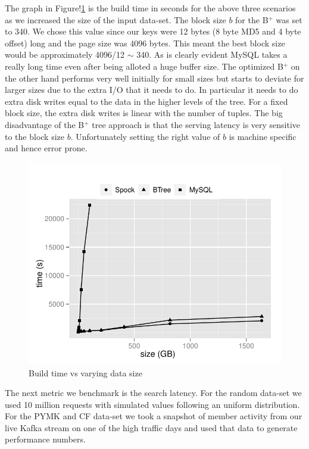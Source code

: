 The graph in Figure!\ref{build} is the build time in seconds for the
above three scenarios as we increased the size of the input data-set.
The block size $b$ for the B$^{+}$ was set to 340. We chose this value
since our keys were 12 bytes (8 byte MD5 and 4 byte offset) long and
the page size was 4096 bytes. This meant the best block size would be
approximately 4096/12 $\sim$ 340. As is clearly evident MySQL takes a
really long time even after being alloted a huge buffer size. The
optimized B$^{+}$ on the other hand performs very well initially for
small sizes but starts to deviate for larger sizes due to the extra
I/O that it needs to do. In particular it needs to do extra disk
writes equal to the data in the higher levels of the tree. For a fixed
block size, the extra disk writes is linear with the number of tuples.
The big disadvantage of the B$^{+}$ tree approach is that the serving
latency is very sensitive to the block size $b$. Unfortunately setting
the right value of $b$ is machine specific and hence error prone. 

\begin{figure}
  \centering
    \includegraphics[scale=0.55]{images/build.pdf}
  \caption{Build time vs varying data size}
  \label{build}
\end{figure}

The next metric we benchmark is the search latency. For the random
data-set we used 10 million requests with simulated values following
an uniform distribution. For the PYMK and CF data-set we took a
snapshot of member activity from our live Kafka stream on one of the
high traffic days and used that data to generate performance numbers.

